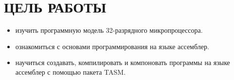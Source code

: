 \section{ЦЕЛЬ РАБОТЫ}

\begin{itemize}
\item изучить программную модель 32-разрядного микропроцессора.

\item ознакомиться с основами программирования на языке ассемблер.

\item научиться создавать, компилировать и компоновать программы
  на языке ассемблер с помощью пакета TASM.
\end{itemize}

\newpage